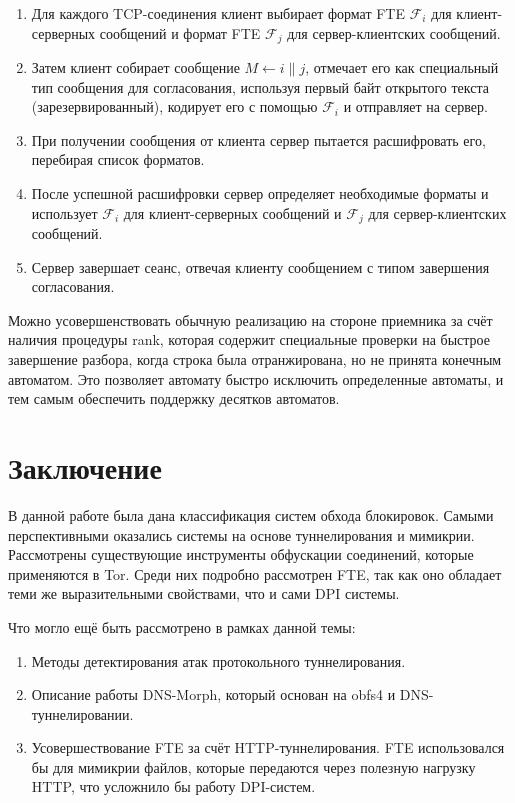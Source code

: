 \begin{enumerate}
    \item Для каждого TCP-соединения клиент выбирает формат FTE $\mathcal{F}_i$ для клиент-серверных сообщений и формат FTE $\mathcal{F}_j$ для сервер-клиентских сообщений.
    \item Затем клиент собирает сообщение $M \leftarrow i \| j$, отмечает его как специальный тип сообщения для согласования,
          используя первый байт открытого текста (зарезервированный),
          кодирует его с помощью $\mathcal{F}_i$ и отправляет на сервер.
    \item При получении сообщения от клиента сервер пытается расшифровать его, перебирая список форматов.
    \item После успешной расшифровки сервер определяет необходимые форматы и использует $\mathcal{F}_i$
          для клиент-серверных сообщений и $\mathcal{F}_j$ для сервер-клиентских сообщений.
    \item Сервер завершает сеанс, отвечая клиенту сообщением с типом завершения согласования.
\end{enumerate}

Можно усовершенствовать обычную реализацию на стороне приемника за счёт наличия процедуры rank,
которая содержит специальные проверки на быстрое завершение разбора, когда строка была отранжирована, но не принята конечным автоматом.
Это позволяет автомату быстро исключить определенные автоматы, и тем самым обеспечить поддержку десятков автоматов.

\section{Заключение}

В данной работе была дана классификация систем обхода блокировок. Самыми перспективными оказались системы на основе туннелирования и мимикрии.
Рассмотрены существующие инструменты обфускации соединений, которые применяются в Tor. Среди них подробно рассмотрен FTE,
так как оно обладает теми же выразительными свойствами, что и сами DPI системы.

Что могло ещё быть рассмотрено в рамках данной темы:
\begin{enumerate}
    \item Методы детектирования атак протокольного туннелирования.
    \item Описание работы DNS-Morph, который основан на obfs4 и DNS-туннелировании.
    \item Усовершествование FTE за счёт HTTP-туннелирования. FTE использовался бы для мимикрии файлов,
          которые передаются через полезную нагрузку HTTP, что усложнило бы работу DPI-систем.
\end{enumerate}

